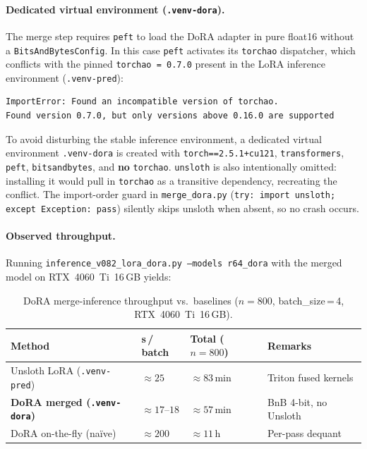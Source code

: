 \documentclass[onecolumn]{article}
\begin{document}
\paragraph{Dedicated virtual environment (\texttt{.venv-dora}).}
The merge step requires \texttt{peft} to load the DoRA adapter in pure
float16 without a \texttt{BitsAndBytesConfig}.
In this case \texttt{peft} activates its \texttt{torchao} dispatcher,
which conflicts with the pinned \texttt{torchao\,=\,0.7.0} present in
the LoRA inference environment (\texttt{.venv-pred}):

\begin{verbatim}
ImportError: Found an incompatible version of torchao.
Found version 0.7.0, but only versions above 0.16.0 are supported
\end{verbatim}

To avoid disturbing the stable inference environment, a dedicated
virtual environment \texttt{.venv-dora} is created with
\texttt{torch==2.5.1+cu121}, \texttt{transformers}, \texttt{peft},
\texttt{bitsandbytes}, and \textbf{no} \texttt{torchao}.
\texttt{unsloth} is also intentionally omitted: installing it would pull
in \texttt{torchao} as a transitive dependency, recreating the conflict.
The import-order guard in \texttt{merge\_dora.py}
(\texttt{try: import unsloth; except Exception: pass}) silently skips
unsloth when absent, so no crash occurs.

\paragraph{Observed throughput.}
Running \texttt{inference\_v082\_lora\_dora.py --models r64\_dora}
with the merged model on RTX~4060~Ti~16\,GB yields:

\begin{table}[h]
\centering
\caption{DoRA merge-inference throughput vs.\ baselines
         ($n{=}800$, batch\_size\,=\,4, RTX~4060~Ti~16\,GB).}
\label{tab:u8_throughput}
\small
\begin{tabular}{llll}
\toprule
\textbf{Method} & \textbf{s\,/\,batch} & \textbf{Total ($n{=}800$)} & \textbf{Remarks} \\
\midrule
Unsloth LoRA (\texttt{.venv-pred})         & $\approx 25$     & $\approx 83$\,min & Triton fused kernels \\
\textbf{DoRA merged (\texttt{.venv-dora})} & $\approx 17$--$18$ & $\approx 57$\,min & BnB 4-bit, no Unsloth \\
DoRA on-the-fly (na\"ive)                  & $\approx 200$    & $\approx 11$\,h   & Per-pass dequant \\
\bottomrule
\end{tabular}
\end{table}
\end{document}
